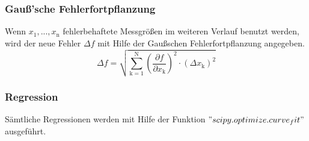 \subsubsection{Gauß'sche Fehlerfortpflanzung}
Wenn $x_\text{1}, ..., x_\text{n}$ fehlerbehaftete Messgrößen im weiteren Verlauf benutzt werden, wird der neue Fehler $\Delta f$ mit Hilfe der Gaußschen Fehlerfortpflanzung angegeben.
\begin{equation}
	\Delta f = \sqrt{\sum_{\text{k}=1}^\text{N} \left( \frac{ \partial f}{\partial x_\text{k}} \right) ^2 \cdot (\Delta x_\text{k})^2}
	\label{eqn:var}
\end{equation}

\subsubsection{Regression}
Sämtliche Regressionen werden mit Hilfe der Funktion $"scipy.optimize.curve_fit"$ ausgeführt.
